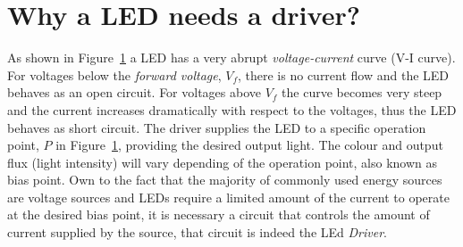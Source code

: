 %
%


\section{Why a LED needs a driver?}

As shown in Figure~\ref{fig:led_I-V} a LED has a very abrupt \emph{voltage-current} curve (V-I curve). For voltages below the \emph{forward voltage}, $V_{f}$, there is no current flow and the LED behaves as an open circuit. For voltages above $V_{f}$ the curve becomes very steep and the current increases dramatically with respect to the voltages, thus the LED behaves as short circuit. The driver supplies the LED to a specific operation point, $P$ in Figure~\ref{fig:led_I-V}, providing the desired output light. The colour and output flux (light intensity) will vary depending of the operation point, also known as bias point.  Own to the fact that the majority of commonly used  energy sources are voltage sources and LEDs require a limited amount of the current to operate at the desired bias point, it is necessary a circuit that controls the amount of current supplied by the source, that circuit is indeed the LEd \emph{Driver}.


\begin{figure}[!h]
\centering
{}
\caption {}
\label{fig:led_I-V}
\end{figure}

